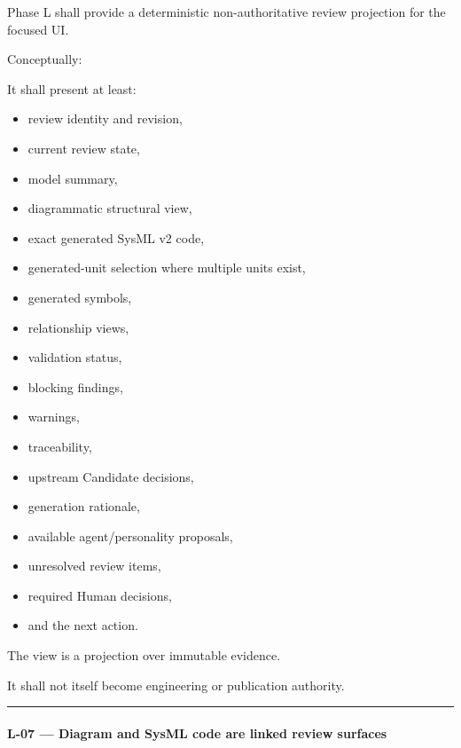 Phase L shall provide a deterministic non-authoritative review projection for the focused UI.

Conceptually:

\begin{Shaded}
\begin{Highlighting}[]
\end{Highlighting}
\end{Shaded}

It shall present at least:

\begin{itemize}
\tightlist
\item
  review identity and revision,
\item
  current review state,
\item
  model summary,
\item
  diagrammatic structural view,
\item
  exact generated SysML v2 code,
\item
  generated-unit selection where multiple units exist,
\item
  generated symbols,
\item
  relationship views,
\item
  validation status,
\item
  blocking findings,
\item
  warnings,
\item
  traceability,
\item
  upstream Candidate decisions,
\item
  generation rationale,
\item
  available agent/personality proposals,
\item
  unresolved review items,
\item
  required Human decisions,
\item
  and the next action.
\end{itemize}

The view is a projection over immutable evidence.

It shall not itself become engineering or publication authority.

\begin{center}\rule{0.5\linewidth}{0.5pt}\end{center}

\hypertarget{l-07--diagram-and-sysml-code-are-linked-review-surfaces}{%
\paragraph{L-07 --- Diagram and SysML code are linked review surfaces}\label{l-07--diagram-and-sysml-code-are-linked-review-surfaces}}

